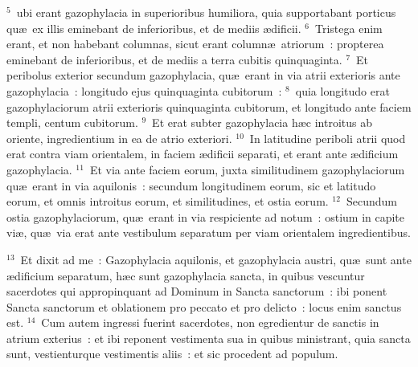 ${}^{5}$~ubi erant gazophylacia in superioribus humiliora, quia supportabant porticus qu\ae\ ex illis eminebant de inferioribus, et de mediis \ae dificii.
${}^{6}$~Tristega enim erant, et non habebant columnas, sicut erant column\ae\ atriorum~: propterea eminebant de inferioribus, et de mediis a terra cubitis quinquaginta.
${}^{7}$~Et peribolus exterior secundum gazophylacia, qu\ae\ erant in via atrii exterioris ante gazophylacia~: longitudo ejus quinquaginta cubitorum~:
${}^{8}$~quia longitudo erat gazophylaciorum atrii exterioris quinquaginta cubitorum, et longitudo ante faciem templi, centum cubitorum.
${}^{9}$~Et erat subter gazophylacia h\ae c introitus ab oriente, ingredientium in ea de atrio exteriori.
${}^{10}$~In latitudine periboli atrii quod erat contra viam orientalem, in faciem \ae dificii separati, et erant ante \ae dificium gazophylacia.
${}^{11}$~Et via ante faciem eorum, juxta similitudinem gazophylaciorum qu\ae\ erant in via aquilonis~: secundum longitudinem eorum, sic et latitudo eorum, et omnis introitus eorum, et similitudines, et ostia eorum.
${}^{12}$~Secundum ostia gazophylaciorum, qu\ae\ erant in via respiciente ad notum~: ostium in capite vi\ae , qu\ae\ via erat ante vestibulum separatum per viam orientalem ingredientibus.


${}^{13}$~Et dixit ad me~: Gazophylacia aquilonis, et gazophylacia austri, qu\ae\ sunt ante \ae dificium separatum, h\ae c sunt gazophylacia sancta, in quibus vescuntur sacerdotes qui appropinquant ad Dominum in Sancta sanctorum~: ibi ponent Sancta sanctorum et oblationem pro peccato et pro delicto~: locus enim sanctus est.
${}^{14}$~Cum autem ingressi fuerint sacerdotes, non egredientur de sanctis in atrium exterius~: et ibi reponent vestimenta sua in quibus ministrant, quia sancta sunt, vestienturque vestimentis aliis~: et sic procedent ad populum.


